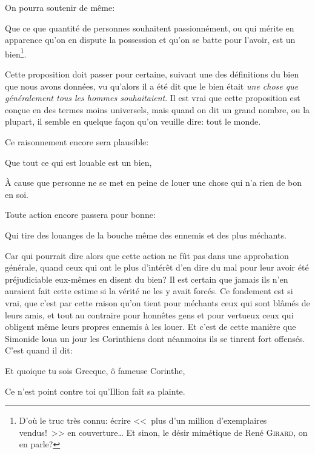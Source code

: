 \bigbreak

On pourra soutenir de même:

\begin{lieu}
	Que ce que quantité de personnes souhaitent passionnément, ou qui mérite en apparence qu'on en dispute la
	possession et qu'on se batte pour l'avoir, est un bien\footnote{D'où le truc très connu: écrire <<~plus d'un
	million d'exemplaires vendus!~>> en couverture\dots{} Et sinon, le désir mimétique de René \textsc{Girard}, on
	en parle?}.
\end{lieu}

Cette proposition doit passer pour certaine, suivant une des définitions du bien que nous avons données, vu qu'alors
il a été dit que le bien était \emph{une chose que généralement tous les hommes souhaitaient}. Il est vrai que cette
proposition est conçue en des termes moins universels, mais quand on dit un grand nombre, ou la plupart, il semble en
quelque façon qu'on veuille dire: tout le monde.

\bigbreak

Ce raisonnement encore sera plausible:

\begin{lieu}
	Que tout ce qui est louable est un bien,
\end{lieu}

À cause que personne ne se met en peine de louer une chose qui n'a rien de bon en soi. 

\bigbreak

Toute action encore passera pour bonne:

\begin{lieu}
	Qui tire des louanges de la bouche même des ennemis et des plus méchants.
\end{lieu}

Car qui pourrait dire alors que cette action ne fût pas dans une approbation générale, quand ceux qui ont le plus d'intérêt
d'en dire du mal pour leur avoir été préjudiciable eux-mêmes en disent du bien? Il est certain que jamais ils n'en auraient
fait cette estime si la vérité ne les y avait forcés. Ce fondement est si vrai, que c'est par cette raison qu'on tient pour
méchants ceux qui sont blâmés de leurs amis, et tout au contraire pour honnêtes gens et pour vertueux ceux qui obligent même
leurs propres ennemis à les louer. Et c'est de cette manière que Simonide loua un jour les Corinthiens dont néanmoins ils se
tinrent fort offensés. C'est quand il dit:

\begin{emphpar}
	Et quoique tu sois Grecque, ô fameuse Corinthe,
	
	Ce n'est point contre toi qu'Illion fait sa plainte.
\end{emphpar}

